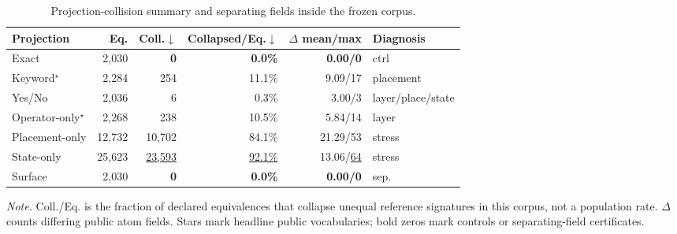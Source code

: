 \begin{table}[t]
\centering
\caption{Projection-collision summary and separating fields inside the frozen corpus.}
\label{tab:contract-collision}
\footnotesize
\setlength{\tabcolsep}{2.2pt}
\begin{tabular*}{\columnwidth}{@{\extracolsep{\fill}}lrrrrl@{}}
\toprule
Projection & Eq. & Coll.$\downarrow$ & Collapsed/Eq.$\downarrow$ & $\Delta$ mean/max & Diagnosis \\
\midrule
Exact & 2,030 & \textbf{0} & \textbf{0.0\%} & \textbf{0.00/0} & ctrl \\
\addlinespace[1pt]
Keyword$^\star$ & 2,284 & 254 & 11.1\% & 9.09/17 & placement \\
Yes/No & 2,036 & 6 & 0.3\% & 3.00/3 & layer/place/state \\
Operator-only$^\star$ & 2,268 & 238 & 10.5\% & 5.84/14 & layer \\
\addlinespace[1pt]
Placement-only & 12,732 & 10,702 & 84.1\% & 21.29/53 & stress \\
State-only & 25,623 & \underline{23,593} & \underline{92.1\%} & 13.06/\underline{64} & stress \\
\addlinespace[1pt]
Surface & 2,030 & \textbf{0} & \textbf{0.0\%} & \textbf{0.00/0} & sep. \\
\bottomrule
\end{tabular*}
\par
\begin{minipage}{\columnwidth}
\footnotesize
\emph{Note.} Coll./Eq. is the fraction of declared equivalences that collapse unequal reference signatures in this corpus, not a population rate.  $\Delta$ counts differing public atom fields.  Stars mark headline public vocabularies; bold zeros mark controls or separating-field certificates.
\end{minipage}
\end{table}
